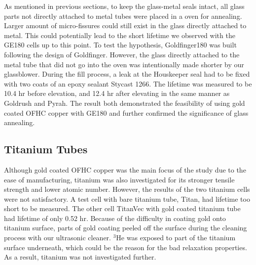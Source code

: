 As mentioned in previous sections, to keep the glass-metal seals intact, all glass parts not directly attached to metal tubes were placed in a oven for annealing. Larger amount of micro-fissures could still exist in the glass directly attached to metal. This could potentially lead to the short lifetime we observed with the GE180 cells up to this point. To test the hypothesis, Goldfinger180 was built following the design of Goldfinger. However, the glass directly attached to the metal tube that did not go into the oven was intentionally made shorter by our glassblower. During the fill process, a leak at the Houskeeper seal had to be fixed with two coats of an epoxy sealant Stycast 1266. The lifetime was measured to be 10.4 hr before elevation, and 12.4 hr after elevating in the same manner as Goldrush and Pyrah. The result both demonstrated the feasibility of using gold coated OFHC copper with GE180 and further confirmed the significance of glass annealing.

\subsection{Titanium Tubes}

Although gold coated OFHC copper was the main focus of the study due to the ease of manufacturing, titanium was also investigated for its stronger tensile strength and lower atomic number. However, the results of the two titanium cells were not satisfactory. A test cell with bare titanium tube, Titan, had lifetime too short to be measured. The other cell TitanVec with gold coated titanium tube had lifetime of only 0.52 hr. Because of the difficulty in coating gold onto titanium surface, parts of gold coating peeled off the surface during the cleaning process with our ultrasonic cleaner. $^{3}$He was exposed to part of the titanium surface underneath, which could be the reason for the bad relaxation properties. As a result, titanium was not investigated further.





